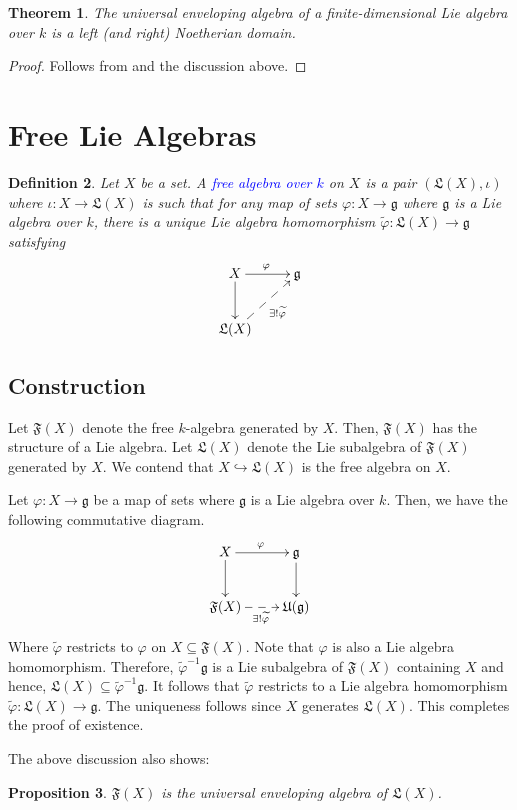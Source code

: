 \documentclass[12pt]{article}
\theoremstyle{thmstyle}
\newtheorem{theorem}{Theorem}[section]
\newtheorem{proposition}[theorem]{Proposition}
\theoremstyle{defstyle}
\newtheorem{definition}[theorem]{Definition}
\newcommand{\frakF}{\mathfrak{F}}
\newcommand{\frakg}{\mathfrak{g}}
\newcommand{\frakL}{\mathfrak{L}}
\newcommand{\frakU}{\mathfrak{U}}
\newcommand{\wt}[1]{\widetilde{#1}}
\newcommand{\into}{\hookrightarrow}
\newcommand{\define}[1]{\textcolor{blue}{\textit{#1}}}
\begin{document}
\begin{theorem}
    The universal enveloping algebra of a finite-dimensional Lie algebra over $k$ is a left (and right) Noetherian domain.
\end{theorem}
\begin{proof}
    Follows from  and the discussion above.
\end{proof}

\section{Free Lie Algebras}

\begin{definition}
    Let $X$ be a set. A \define{free algebra over $k$} on $X$ is a pair $(\frakL(X), \iota)$ where $\iota: X\to\frakL(X)$ is such that for any map of sets $\varphi: X\to\frakg$ where $\frakg$ is a Lie algebra over $k$, there is a unique Lie algebra homomorphism $\wt\varphi:\frakL(X)\to\frakg$ satisfying 
    \begin{equation*}
        \xymatrix {
            X\ar[r]^{\varphi}\ar[d] & \frakg\\
            \frakL(X)\ar@{-->}[ru]_{\exists!\wt\varphi}
        }
    \end{equation*}
\end{definition}

\subsection{Construction}

Let $\mathfrak F(X)$ denote the free $k$-algebra generated by $X$. Then, $\frakF(X)$ has the structure of a Lie algebra. Let $\frakL(X)$ denote the Lie subalgebra of $\frakF(X)$ generated by $X$. We contend that $X\into\frakL(X)$ is the free algebra on $X$.

Let $\varphi: X\to\frakg$ be a map of sets where $\frakg$ is a Lie algebra over $k$. Then, we have the following commutative diagram. 
\begin{equation*}
    \xymatrix {
        X\ar[r]^\varphi\ar[d] & \frakg\ar[d]\\
        \frakF(X)\ar@{-->}[r]_{\exists!\wt\varphi} & \frakU(\frakg)
    }
\end{equation*}
Where $\wt\varphi$ restricts to $\varphi$ on $X\subseteq\frakF(X)$. Note that $\varphi$ is also a Lie algebra homomorphism. Therefore, $\wt\varphi^{-1}\frakg$ is a Lie subalgebra of $\frakF(X)$ containing $X$ and hence, $\frakL(X)\subseteq\wt\varphi^{-1}\frakg$. It follows that $\wt\varphi$ restricts to a Lie algebra homomorphism $\wt\varphi: \frakL(X)\to\frakg$. The uniqueness follows since $X$ generates $\frakL(X)$. This completes the proof of existence. 

The above discussion also shows: 
\begin{proposition}
    $\frakF(X)$ is the universal enveloping algebra of $\frakL(X)$.
\end{proposition}
\end{document}
